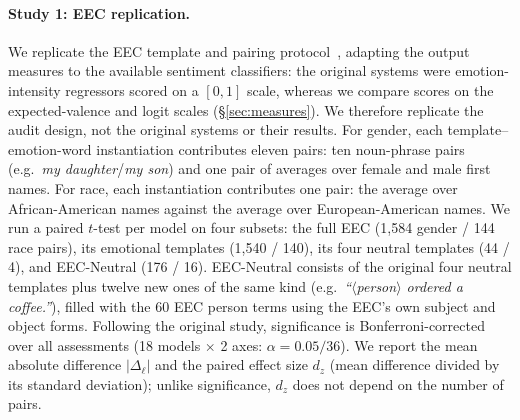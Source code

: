 \documentclass[runningheads]{llncs}
\begin{document}
\paragraph{Study 1: EEC replication.} We replicate the EEC template and pairing
protocol~\cite{kiritchenko2018}, adapting the output measures to the available
sentiment classifiers: the original systems were emotion-intensity regressors
scored on a $[0,1]$ scale, whereas we compare scores on the expected-valence and
logit scales (\S\ref{sec:measures}). We therefore replicate the audit design, not
the original systems or their results. For gender, each template--emotion-word
instantiation contributes eleven pairs: ten noun-phrase pairs (e.g.\ \emph{my
daughter}/\emph{my son}) and one pair of averages over female and male first
names. For race, each instantiation contributes one pair: the average over
African-American names against the average over European-American names. We
run a paired $t$-test per model on four subsets: the full EEC
(1,584 gender / 144 race pairs), its emotional templates (1,540 / 140), its
four neutral templates (44 / 4), and EEC-Neutral (176 / 16). EEC-Neutral
consists of the original four neutral templates plus twelve new ones of the same
kind (e.g.\ \emph{``$\langle$person$\rangle$ ordered a coffee.''}), filled with
the 60 EEC person terms using the EEC's own subject and object forms. Following
the original study, significance is Bonferroni-corrected over all assessments
(18 models $\times$ 2 axes: $\alpha = 0.05/36$). We report the mean absolute
difference $|\Delta_\ell|$ and the paired effect size $d_z$ (mean difference
divided by its standard deviation); unlike significance, $d_z$ does not depend
on the number of pairs.
\end{document}
